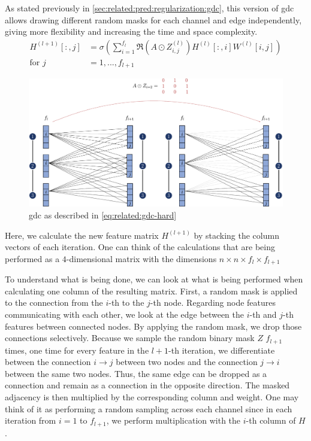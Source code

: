 As stated previously in \cref{sec:related:pred:regularization:gdc}, this version of \ac{gdc} allows drawing different random masks for each channel and edge independently, giving more flexibility and increasing the time and space complexity.
\begin{equation}
    \begin{aligned}
        H^{(l+1)}[:,j] & = \sigma \left(\sum_{i=1}^{f_{l}}\mathfrak{R}\left(A \odot Z_{i,j}^{(l)}\right)H^{(l)}[:,i]W^{(l)}[i,j]\right) \\
        \text{for } j  & = 1,..., f_{l+1}
    \end{aligned}\label{eq:implementaion:GDC-eq4}
\end{equation}
\begin{figure}[ht]
    \centering
    \includegraphics[width= 0.90\linewidth]{gfx/implementation/GDC-eq5.pdf}
    \caption{\Ac{gdc} as described in \cref{eq:related:gdc-hard}}\label{fig:implementaion:GDC-eq5}
\end{figure}
Here, we calculate the new feature matrix $H^{(l+1)}$ by stacking the column vectors of each iteration. One can think of the calculations that are being performed as a $4$-dimensional matrix with the dimensions $n\times n\times f_{l}\times f_{l+1}$

To understand what is being done, we can look at what is being performed when calculating one column of the resulting matrix. First, a random mask is applied to the connection from the $i$-th to the $j$-th node. Regarding node features communicating with each other, we look at the edge between the $i$-th and $j$-th features between connected nodes. By applying the random mask, we drop those connections selectively. Because we sample the random binary mask $Z$ $f_{l+1}$ times, one time for every feature in the $l+1$-th iteration, we differentiate between the connection $i \rightarrow j$ between two nodes and the connection $j \rightarrow i$ between the same two nodes. Thus, the same edge can be dropped as a connection and remain as a connection in the opposite direction. The masked adjacency is then multiplied by the corresponding column and weight.
One may think of it as performing a random sampling across each channel since in each iteration from $i=1$ to $f_{l+1}$, we perform multiplication with the $i$-th column of $H$.

